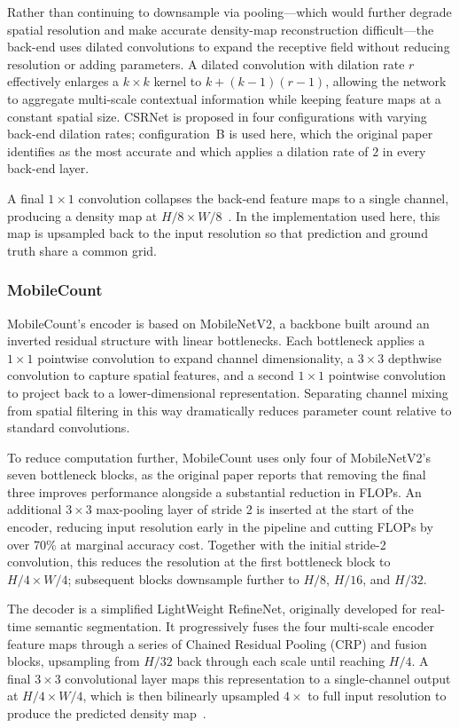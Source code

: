 \documentclass[conference]{IEEEtran}
\begin{document}
Rather than continuing to downsample via pooling---which would further degrade
spatial resolution and make accurate density-map reconstruction
difficult---the back-end uses dilated convolutions to expand the receptive field
without reducing resolution or adding parameters. A dilated convolution with
dilation rate $r$ effectively enlarges a $k \times k$ kernel to
$k + (k-1)(r-1)$, allowing the network to aggregate multi-scale contextual
information while keeping feature maps at a constant spatial size. CSRNet is
proposed in four configurations with varying back-end dilation rates;
configuration~B is used here, which the original paper identifies as the most
accurate and which applies a dilation rate of $2$ in every back-end layer.

A final $1 \times 1$ convolution collapses the back-end feature maps to a single
channel, producing a density map at $H/8 \times W/8$~\cite{li2018csrnet}. In the
implementation used here, this map is upsampled back to the input resolution so
that prediction and ground truth share a common grid.

\subsubsection{MobileCount}
MobileCount's encoder is based on MobileNetV2, a backbone built around an
inverted residual structure with linear bottlenecks. Each bottleneck applies a
$1 \times 1$ pointwise convolution to expand channel dimensionality, a
$3 \times 3$ depthwise convolution to capture spatial features, and a second
$1 \times 1$ pointwise convolution to project back to a lower-dimensional
representation. Separating channel mixing from spatial filtering in this way
dramatically reduces parameter count relative to standard convolutions.

To reduce computation further, MobileCount uses only four of MobileNetV2's seven
bottleneck blocks, as the original paper reports that removing the final three
improves performance alongside a substantial reduction in FLOPs. An additional
$3 \times 3$ max-pooling layer of stride 2 is inserted at the start of the
encoder, reducing input resolution early in the pipeline and cutting FLOPs by
over 70\% at marginal accuracy cost. Together with the initial stride-2
convolution, this reduces the resolution at the first bottleneck block to
$H/4 \times W/4$; subsequent blocks downsample further to $H/8$, $H/16$, and
$H/32$.

The decoder is a simplified LightWeight RefineNet, originally developed for
real-time semantic segmentation. It progressively fuses the four multi-scale
encoder feature maps through a series of Chained Residual Pooling (CRP) and
fusion blocks, upsampling from $H/32$ back through each scale until reaching
$H/4$. A final $3 \times 3$ convolutional layer maps this representation to a
single-channel output at $H/4 \times W/4$, which is then bilinearly upsampled
$4\times$ to full input resolution to produce the predicted density
map~\cite{wang2020mobilecount}.
\end{document}
